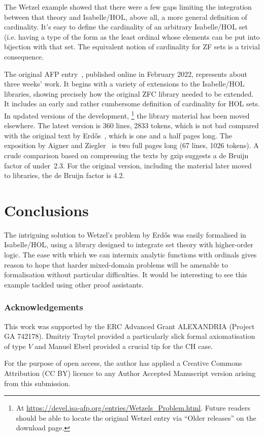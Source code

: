 \documentclass[runningheads]{llncs}
\begin{document}
The Wetzel example showed that there were a few gaps limiting the integration between that theory and Isabelle/HOL, above all, a more general definition of cardinality. It's easy to define the cardinality of an arbitrary Isabelle/HOL set (i.e. having a type of the form  as the least ordinal whose elements can be put into bijection with that set.
The equivalent notion of cardinality for ZF sets is a trivial consequence.

The original AFP entry~\cite{Wetzels_Problem-AFP}, published online in February 2022, represents about three weeks' work.
It begins with a variety of extensions to the Isabelle/HOL libraries, showing precisely how the original ZFC library needed to be extended.
It includes an early and rather cumbersome definition of cardinality for HOL sets. In updated versions of the development,%
\footnote{At \url{https://devel.isa-afp.org/entries/Wetzels_Problem.html}. Future readers should be able to locate the original Wetzel entry via ``Older releases'' on the download page.}
%
the library material has been moved elsewhere. The latest version is 360 lines, 2833 tokens, which is not bad compared with the original text by Erdős~\cite{erdos-interpolation}, which is one and a half pages long. The exposition by Aigner and Ziegler~\cite{aigner-proofs} is two full pages long (67 lines, 1026 tokens). A crude comparison based on compressing the texts by gzip suggests a de Bruijn factor of under~2.3. For the original version, including the material later moved to libraries, the de Bruijn factor is 4.2.

\section{Conclusions}

The intriguing solution to Wetzel's problem by Erd\H{o}s was easily formalised in Isabelle/HOL, using a library designed to integrate set theory with higher-order logic.
The ease with which we can intermix analytic functions with ordinals gives reason to hope that harder mixed-domain problems will be amenable to formalisation without particular difficulties.
It would be interesting to see this example tackled using other proof assistants.

\subsubsection{Acknowledgements} 
This work was supported by the ERC Advanced Grant ALEXANDRIA (Project GA 742178). 
Dmitriy Traytel provided a particularly slick formal axiomatisation of type $V$ and Manuel Eberl provided a crucial tip for the CH case.

For the purpose of open access, the author has applied a Creative Commons Attribution (CC BY) licence to any Author Accepted Manuscript version arising from this submission.




\end{document}
